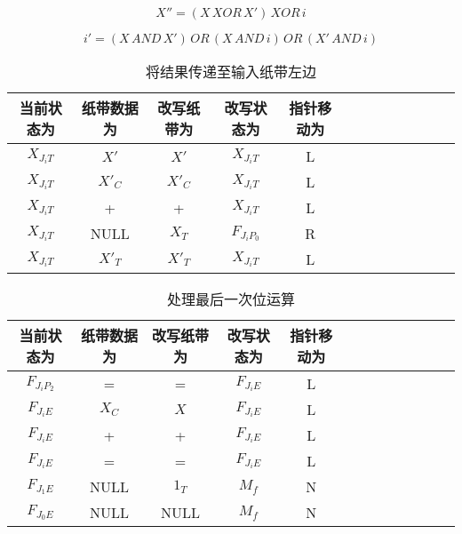 \documentclass[UTF8]{ctexart}
\begin{document}
\begin{equation*}
    X''=(X\,XOR\,X')\,XOR\,i
\end{equation*}

\begin{equation*}
    i'= (X\,AND\,X')\,OR\,(X\,AND\,i)\,OR\,(X'\,AND\,i)
\end{equation*}

\newpage

\begin{table}[h!]
    \begin{center}
        \caption{将结果传递至输入纸带左边}
        \begin{tabular}{|c|c|c|c|c|c|c|c|c|c|c|c|c|}
            \hline
            当前状态为 & 纸带数据为 & 改写纸带为 & 改写状态为 & 指针移动为 \\
            \hline
            $X_{J_{i}T}$ & $X'$ & $X'$ & $X_{J_{i}T}$ & L \\
            \hline
            $X_{J_{i}T}$ & $X'_{C}$ & $X'_{C}$ & $X_{J_{i}T}$ & L \\
            \hline
            $X_{J_{i}T}$ & + & + & $X_{J_{i}T}$ & L \\
            \hline
            $X_{J_{i}T}$ & NULL & $X_{T}$ & $F_{J_{i}P_{0}}$ & R \\
            \hline
            $X_{J_{i}T}$ & $X'_{T}$ & $X'_{T}$ & $X_{J_{i}T}$ & L \\
            \hline
        \end{tabular}
    \end{center}
\end{table}

\begin{table}[h!]
    \begin{center}
        \caption{处理最后一次位运算}
        \begin{tabular}{|c|c|c|c|c|c|c|c|c|c|c|c|c|}
            \hline
            当前状态为 & 纸带数据为 & 改写纸带为 & 改写状态为 & 指针移动为 \\
            \hline
            $F_{J_{i}P_{2}}$ & = & = & $F_{J_{i}E}$ & L \\
            \hline
            $F_{J_{i}E}$ & $X_{C}$ & $X$ & $F_{J_{i}E}$ & L \\
            \hline
            $F_{J_{i}E}$ & + & + & $F_{J_{i}E}$ & L \\
            \hline
            $F_{J_{i}E}$ & = & = & $F_{J_{i}E}$ & L \\
            \hline
            $F_{J_{1}E}$ & NULL & $1_{T}$ & $M_{f}$ & N \\
            \hline
            $F_{J_{0}E}$ & NULL & NULL & $M_{f}$ & N \\
            \hline
        \end{tabular}
    \end{center}
\end{table}
\end{document}
